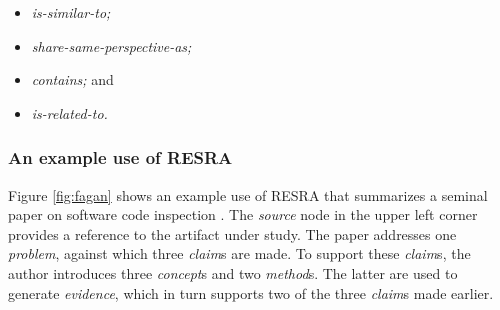 \begin{itemize}
\item {\it is-similar-to;\/}
  
\item {\it share-same-perspective-as;\/}

\item {\it contains;\/} and
  
\item {\it is-related-to.\/}
\end{itemize}

\begin{quotation}
\end{quotation}

\begin{quotation}
\end{quotation}

\begin{quotation}
\end{quotation}

\begin{quotation}
\end{quotation}


\subsubsection{An example use of RESRA}

Figure \ref{fig:fagan} shows an example use of RESRA that summarizes a
seminal paper on software code inspection \cite{Fagan76}.  The {\em source}
node in the upper left corner provides a reference to the artifact under
study. The paper addresses one {\em problem}, against which three {\em
claim}s are made. To support these {\em claim}s, the author introduces
three {\em concept}s and two {\em method}s. The latter are used to generate
{\em evidence}, which in turn supports two of the three {\em claim}s made
earlier.

\begin{quotation}
\end{quotation}

